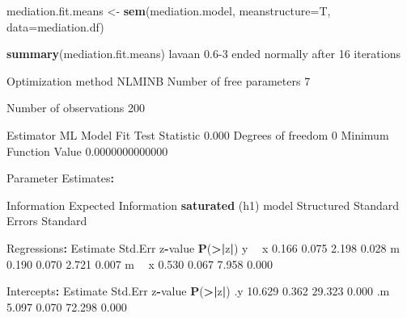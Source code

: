 \documentclass[]{article}
\newenvironment{Shaded}{\begin{snugshade}}{\end{snugshade}}
\newcommand{\DataTypeTok}[1]{\textcolor[rgb]{0.13,0.29,0.53}{#1}}
\newcommand{\DecValTok}[1]{\textcolor[rgb]{0.00,0.00,0.81}{#1}}
\newcommand{\ErrorTok}[1]{\textcolor[rgb]{0.64,0.00,0.00}{\textbf{#1}}}
\newcommand{\FloatTok}[1]{\textcolor[rgb]{0.00,0.00,0.81}{#1}}
\newcommand{\KeywordTok}[1]{\textcolor[rgb]{0.13,0.29,0.53}{\textbf{#1}}}
\newcommand{\NormalTok}[1]{#1}
\newcommand{\OperatorTok}[1]{\textcolor[rgb]{0.81,0.36,0.00}{\textbf{#1}}}
\newcommand{\StringTok}[1]{\textcolor[rgb]{0.31,0.60,0.02}{#1}}
\begin{document}
\begin{Shaded}
\begin{Highlighting}[]
\NormalTok{mediation.fit.means <-}\StringTok{ }\KeywordTok{sem}\NormalTok{(mediation.model,}
                           \DataTypeTok{meanstructure=}\NormalTok{T,}
                           \DataTypeTok{data=}\NormalTok{mediation.df)}

\KeywordTok{summary}\NormalTok{(mediation.fit.means)}
\NormalTok{lavaan }\FloatTok{0.6}\DecValTok{-3}\NormalTok{ ended normally after }\DecValTok{16}\NormalTok{ iterations}

\NormalTok{  Optimization method                           NLMINB}
\NormalTok{  Number of free parameters                          }\DecValTok{7}

\NormalTok{  Number of observations                           }\DecValTok{200}

\NormalTok{  Estimator                                         ML}
\NormalTok{  Model Fit Test Statistic                       }\FloatTok{0.000}
\NormalTok{  Degrees of freedom                                 }\DecValTok{0}
\NormalTok{  Minimum Function Value               }\FloatTok{0.0000000000000}

\NormalTok{Parameter Estimates}\OperatorTok{:}

\StringTok{  }\NormalTok{Information                                 Expected}
\NormalTok{  Information }\KeywordTok{saturated}\NormalTok{ (h1) model          Structured}
\NormalTok{  Standard Errors                             Standard}

\NormalTok{Regressions}\OperatorTok{:}
\StringTok{                   }\NormalTok{Estimate  Std.Err  z}\OperatorTok{-}\NormalTok{value  }\KeywordTok{P}\NormalTok{(}\OperatorTok{>}\ErrorTok{|}\NormalTok{z}\OperatorTok{|}\NormalTok{)}
\NormalTok{  y }\OperatorTok{~}\StringTok{                                                 }
\StringTok{    }\NormalTok{x                 }\FloatTok{0.166}    \FloatTok{0.075}    \FloatTok{2.198}    \FloatTok{0.028}
\NormalTok{    m                 }\FloatTok{0.190}    \FloatTok{0.070}    \FloatTok{2.721}    \FloatTok{0.007}
\NormalTok{  m }\OperatorTok{~}\StringTok{                                                 }
\StringTok{    }\NormalTok{x                 }\FloatTok{0.530}    \FloatTok{0.067}    \FloatTok{7.958}    \FloatTok{0.000}

\NormalTok{Intercepts}\OperatorTok{:}
\StringTok{                   }\NormalTok{Estimate  Std.Err  z}\OperatorTok{-}\NormalTok{value  }\KeywordTok{P}\NormalTok{(}\OperatorTok{>}\ErrorTok{|}\NormalTok{z}\OperatorTok{|}\NormalTok{)}
\NormalTok{   .y                }\FloatTok{10.629}    \FloatTok{0.362}   \FloatTok{29.323}    \FloatTok{0.000}
\NormalTok{   .m                 }\FloatTok{5.097}    \FloatTok{0.070}   \FloatTok{72.298}    \FloatTok{0.000}


\end{Highlighting}
\end{Shaded}
\end{document}
